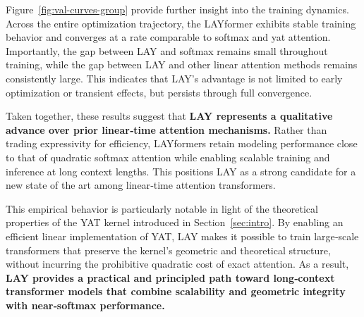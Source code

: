 \documentclass{article}
\begin{document}
\begin{figure}[h]
\end{figure}

Figure~\ref{fig:val-curves-group} provide further insight into the training dynamics.
Across the entire optimization trajectory, the LAYformer exhibits stable training behavior and converges
at a rate comparable to softmax and yat attention.
Importantly, the gap between LAY and softmax remains small throughout training, while the gap between LAY
and other linear attention methods remains consistently large.
This indicates that LAY’s advantage is not limited to early optimization or transient effects, but persists
through full convergence.

Taken together, these results suggest that \textbf{LAY represents a qualitative advance over prior linear‑time
attention mechanisms.}
Rather than trading expressivity for efficiency, LAYformers retain modeling performance close to that of
quadratic softmax attention while enabling scalable training and inference at long context lengths.
This positions LAY as a strong candidate for a new state of the art among linear‑time attention transformers.

This empirical behavior is particularly notable in light of the theoretical properties of the YAT kernel
introduced in Section~\ref{sec:intro}.
By enabling an efficient linear implementation of YAT, LAY makes it possible to train large‑scale
transformers that preserve the kernel’s geometric and theoretical structure, without incurring the
prohibitive quadratic cost of exact attention.
As a result, \textbf{LAY provides a practical and principled path toward long‑context transformer models that
combine scalability and geometric integrity with near‑softmax performance.}
\end{document}
